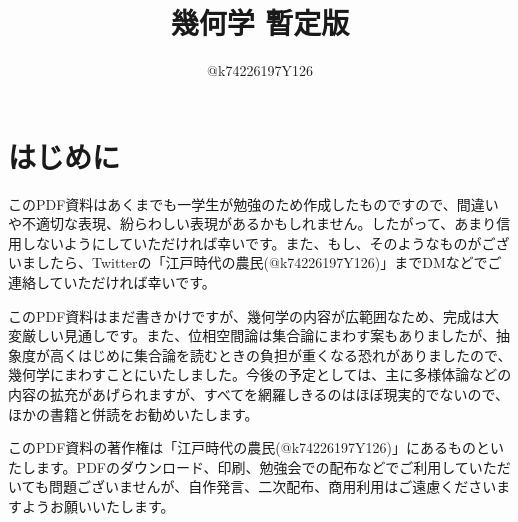 \documentclass[10pt,a4paper,titlepage]{jsarticle}
\title{幾何学 暫定版}
\author{@k74226197Y126}
\begin{document}
\maketitle
{}
\section*{はじめに}
このPDF資料はあくまでも一学生が勉強のため作成したものですので、間違いや不適切な表現、紛らわしい表現があるかもしれません。したがって、あまり信用しないようにしていただければ幸いです。また、もし、そのようなものがございましたら、Twitterの「江戸時代の農民(@k74226197Y126)」までDMなどでご連絡していただければ幸いです。\par
このPDF資料はまだ書きかけですが、幾何学の内容が広範囲なため、完成は大変厳しい見通しです。また、位相空間論は集合論にまわす案もありましたが、抽象度が高くはじめに集合論を読むときの負担が重くなる恐れがありましたので、幾何学にまわすことにいたしました。今後の予定としては、主に多様体論などの内容の拡充があげられますが、すべてを網羅しきるのはほぼ現実的でないので、ほかの書籍と併読をお勧めいたします。\par
このPDF資料の著作権は「江戸時代の農民(@k74226197Y126)」にあるものといたします。PDFのダウンロード、印刷、勉強会での配布などでご利用していただいても問題ございませんが、自作発言、二次配布、商用利用はご遠慮くださいますようお願いいたします。
\tableofcontents
\clearpage
{}


\clearpage

\clearpage

\clearpage

\clearpage

\clearpage

\clearpage

\clearpage

\clearpage

\clearpage

\clearpage


\clearpage

\clearpage

\clearpage

\clearpage

\clearpage

\clearpage


\end{document}
